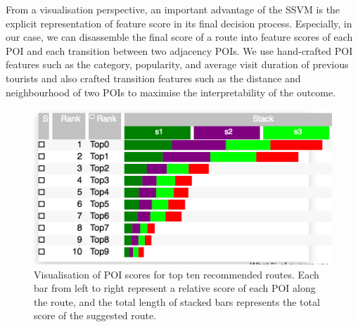 \documentclass[sigconf]{acmart}
\begin{document}
From a visualisation perspective, an important advantage of the SSVM is the explicit representation of feature score in its final decision process. Especially, in our case, we can disassemble the final score of a route into feature scores of each POI and each transition between two adjacency POIs. 
We use hand-crafted POI features such as the category, popularity, and average visit duration of previous tourists and also crafted transition features such as the distance and neighbourhood of two POIs to maximise the interpretability of the outcome.

\begin{figure}[t!]
\includegraphics[width=0.9\linewidth]{figure/sample_stack.png}
\caption{Visualisation of POI scores for top ten recommended routes. Each bar from left to right represent a relative score of each POI along the route, and the total length of stacked bars represents the total score of the suggested route.}
\label{fig:stack}
\end{figure}
\end{document}
